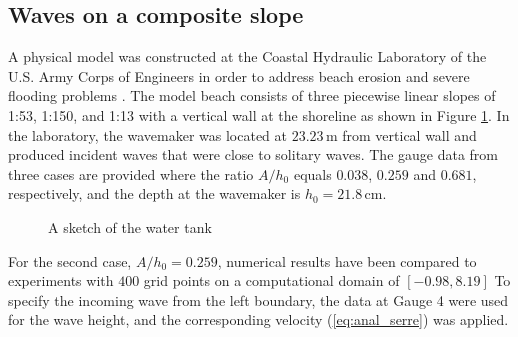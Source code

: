 \documentclass[review]{elsarticle}
\newcommand{\m}{\,\mathrm{m}}
\newcommand{\cm}{\,\mbox{cm}}
\begin{document}
\subsection{Waves on a composite slope}
\label{sec:comp_test}
A physical model was constructed at the Coastal Hydraulic Laboratory of the U.S. Army Corps of Engineers
in order to address beach erosion and severe flooding problems \citep{chl_bp5}. 
The model beach consists of three piecewise linear slopes of 1:53, 1:150, and 1:13 with a vertical wall at the shoreline as shown in Figure \ref{fig:bp5_water_tank}.
In the laboratory, the wavemaker was located at $23.23\m$ from vertical wall and produced incident waves that were close to solitary waves.
The gauge data from three cases are provided 
where the ratio $A/h_0$ equals  $0.038$, $0.259$ and $0.681$, respectively,
and the depth at the wavemaker is  $h_0=21.8\cm$.

\begin{figure}[!htb]
\centering
{}
  \caption{A sketch of the water tank}
  \label{fig:bp5_water_tank}
\end{figure}

For the second case, $A/h_0=0.259$, numerical results 
have been compared to experiments
with $400$ grid points on a computational domain of $[-0.98,8.19]$
To specify the incoming wave from the left boundary, 
the data at Gauge 4 were used for the wave height,
and the corresponding velocity (\ref{eq:anal_serre})
was applied.
\end{document}
